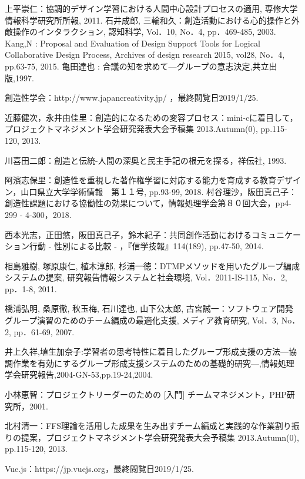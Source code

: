 \documentclass{funthesis}
\begin{document}
\begin{thebibliography}{9}
  上平崇仁：協調的デザイン学習における人間中心設計プロセスの適用, 専修大学情報科学研究所所報, 2011.
石井成郎, 三輪和久：創造活動における心的操作と外敵操作のインタラクション, 認知科学, Vol．10, No．4, pp．469-485, 2003.
Kang,N : Proposal and Evaluation of Design
Support Tools for Logical Collaborative Design Process, Archives of design research 2015, vol28, No．4, pp.63-75, 2015.
亀田達也 : 合議の知を求めて—グループの意志決定,共立出版,1997.

創造性学会：http://www.japancreativity.jp/ ，最終閲覧日2019/1/25.

近藤健次，永井由佳里：創造的になるための変容プロセス：mini-cに着目して，プロジェクトマネジメント学会研究発表大会予稿集 2013.Autumn(0), pp.115-120, 2013.

川喜田二郎：創造と伝統-人間の深奥と民主手記の根元を探る，祥伝社, 1993.

阿濱志保里：創造性を重視した著作権学習に対応する能力を育成する教育デザイン，山口県立大学学術情報　第１１号, pp.93-99, 2018.
村谷理沙，阪田真己子：創造性課題における協働性の効果について，情報処理学会第８０回大会，pp4-299 - 4-300，2018.

西本光志，正田悠，阪田真己子，鈴木紀子：共同創作活動におけるコミュニケーション行動 - 性別による比較 - ，『信学技報』114(189), pp.47-50, 2014.

相島雅樹, 塚原康仁, 植木淳郎, 杉浦一徳：DTMPメソッドを用いたグループ編成システムの提案, 研究報告情報システムと社会環境, Vol．2011-IS-115, No．2, pp．1-8, 2011.

橋浦弘明, 桑原徹, 秋玉梅, 石川達也, 山下公太郎, 古宮誠一：ソフトウェア開発グループ演習のためのチーム編成の最適化支援, メディア教育研究, Vol．3, No．2, pp．61-69, 2007.

井上久祥,埴生加奈子:学習者の思考特性に着目したグループ形成支援の方法—協調作業を有効にするグループ形成支援システムのための基礎的研究—,情報処理学会研究報告,2004-GN-53,pp.19-24,2004.

小林恵智：プロジェクトリーダーのための [入門] チームマネジメント，PHP研究所，2001.

北村清一：FFS理論を活用した成果を生み出すチーム編成と実践的な作業割り振りの提案，プロジェクトマネジメント学会研究発表大会予稿集 2013.Autumn(0), pp.115-120, 2013.

Vue.js：https://jp.vuejs.org，最終閲覧日2019/1/25.


\end{thebibliography}
\end{document}
